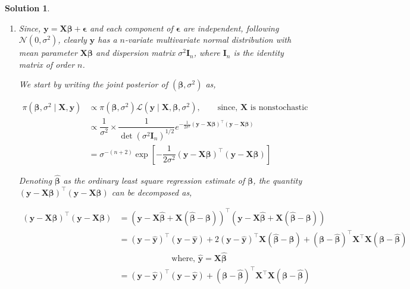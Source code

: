 \documentclass[12pt]{article}
\theoremstyle{problemstyle}
\newtheorem*{solution*}{Solution}
\newcommand{\normal}{\mathcal{N}}
\newcommand{\bb}[1]{\boldsymbol{#1}}
\newcommand{\transpose}{^\intercal}
\begin{document}
\begin{solution*}
    \begin{enumerate}
        \item[(a)] Since, $\bb{y} = \bb{X}\bb{\beta} + \bb{\epsilon}$ and each component of $\bb{\epsilon}$ are independent, following $\normal(0, \sigma^2)$, clearly $\bb{y}$ has a $n$-variate multivariate normal distribution with mean parameter $\bb{X}\bb{\beta}$ and dispersion matrix $\sigma^2 \bb{I}_n$, where $\bb{I}_n$ is the identity matrix of order $n$.
        
        We start by writing the joint posterior of $(\bb{\beta}, \sigma^2)$ as,
        
        \begin{align*}
            \pi(\bb{\beta}, \sigma^2 \mid \bb{X}, \bb{y}) 
            & \propto \pi(\bb{\beta}, \sigma^2) \mathcal{L}(\bb{y}\mid \bb{X}, \bb{\beta}, \sigma^2), \qquad \text{since, } \bb{X} \text{ is nonstochastic}\\
            & \propto \dfrac{1}{\sigma^2} \times \dfrac{1}{\det(\sigma^2 \bb{I}_n)^{1/2}} e^{-\frac{1}{2\sigma^2} (\bb{y} - \bb{X}\bb{\beta})\transpose (\bb{y} - \bb{X}\bb{\beta})} \\
            & = \sigma^{-(n+2)} \exp\left[ -\dfrac{1}{2\sigma^2} (\bb{y} - \bb{X}\bb{\beta})\transpose (\bb{y} - \bb{X}\bb{\beta}) \right]
        \end{align*}

        Denoting $\widehat{\bb{\beta}}$ as the ordinary least square regression estimate of $\bb{\beta}$, the quantity $(\bb{y} - \bb{X}\bb{\beta})\transpose (\bb{y} - \bb{X}\bb{\beta})$ can be decomposed as,

        \begin{align*}
            (\bb{y} - \bb{X}\bb{\beta})\transpose (\bb{y} - \bb{X}\bb{\beta})
            & = (\bb{y} - \bb{X}\widehat{\bb{\beta}} + \bb{X}(\widehat{\bb{\beta}} - \bb{\beta}) )\transpose (\bb{y} - \bb{X}\widehat{\bb{\beta}} + \bb{X}(\widehat{\bb{\beta}} - \bb{\beta}))\\
            & = (\bb{y} - \widehat{\bb{y}})\transpose (\bb{y} - \widehat{\bb{y}}) + 2(\bb{y} - \widehat{\bb{y}})\transpose \bb{X} (\widehat{\bb{\beta}} - \bb{\beta}) + (\bb{\beta} - \widehat{\bb{\beta}})\transpose \bb{X}\transpose \bb{X} (\bb{\beta} - \widehat{\bb{\beta}})\\
            & \qquad \qquad \qquad \text{ where, } \widehat{\bb{y}} = \bb{X}\widehat{\bb{\beta}}\\
            & = (\bb{y} - \widehat{\bb{y}})\transpose (\bb{y} - \widehat{\bb{y}}) + (\bb{\beta} - \widehat{\bb{\beta}})\transpose \bb{X}\transpose \bb{X} (\bb{\beta} - \widehat{\bb{\beta}})
        \end{align*}


\end{enumerate}
\end{solution*}
\end{document}
